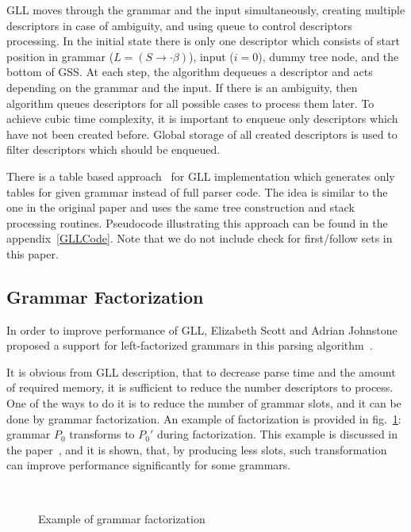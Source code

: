 \documentclass[runningheads,a4paper]{llncs}
\begin{document}
GLL moves through the grammar and the input simultaneously, creating multiple descriptors in case of ambiguity, and using queue to control descriptors processing.
In the initial state there is only one descriptor which consists of start position in grammar ($L = (S \to \cdot \beta)$), input ($i=0$), dummy tree node, and the bottom of GSS.
At each step, the algorithm dequeues a descriptor and acts depending on the grammar and the input.
If there is an ambiguity, then algorithm queues descriptors for all possible cases to process them later. 
To achieve cubic time complexity, it is important to enqueue only descriptors which have not been created before.
Global storage of all created descriptors is used to filter descriptors which should be enqueued.

There is a table based approach~\cite{ragozina} for GLL implementation which generates only tables for given grammar instead of full parser code.
The idea is similar to the one in the original paper and uses the same tree construction and stack processing routines.
Pseudocode illustrating this approach can be found in the appendix~\ref{GLLCode}.
Note that we do not include check for first/follow sets in this paper.


\subsection{Grammar Factorization}%

In order to improve performance of GLL, Elizabeth Scott and Adrian Johnstone proposed a support for left-factorized grammars in this parsing algorithm~\cite{scott2016structuring}. 

It is obvious from GLL description, that to decrease parse time and the amount of required memory, it is sufficient to reduce the number descriptors to process.
One of the ways to do it is to reduce the number of grammar slots, and it can be done by grammar factorization.
An example of factorization is provided in fig.~\ref{fig:ExampleOfFactorization}: grammar $P_0$ transforms to $P_0'$ during factorization.
This example is discussed in the paper~\cite{scott2016structuring}, and it is shown, that, by producing less slots, such transformation can improve performance significantly for some grammars.

\begin{figure}
    \centering
    ~
    \caption{Example of grammar factorization}
    \label{fig:ExampleOfFactorization}
\end{figure}
\end{document}
